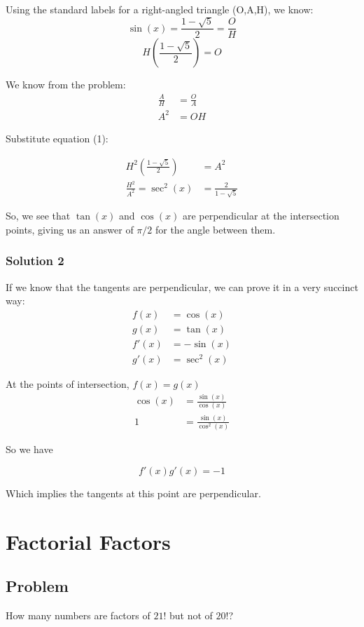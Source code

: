 \documentclass{article}
\begin{document}
Using the standard labels for a right-angled triangle (O,A,H), we know:
\begin{equation*}
\sin(x)=\frac{1-\sqrt{5}}{2}=\frac{O}{H}
\end{equation*}
\begin{equation}
H(\frac{1-\sqrt{5}}{2})=O
\end{equation}

We know from the problem:
\begin{align*}
  \frac{A}{H}&=\frac{O}{A}\\
  A^2&=OH
\end{align*}

Substitute equation (1):

\begin{align*}
  H^2(\frac{1-\sqrt{5}}{2})&=A^2\\
  \frac{H^2}{A^2}=\sec^2(x)&=\frac{2}{1-\sqrt{5}}
\end{align*}

So, we see that \(\tan(x)\) and \(\cos(x)\) are perpendicular at the intersection points, giving us an answer of \(\pi/2\) for the angle between them.
\subsubsection{Solution 2}
If we know that the tangents are perpendicular, we can prove it in a very succinct way:
\begin{align*}
  f(x)&=\cos(x)\\
  g(x)&=\tan(x)\\
  f'(x)&=-\sin(x)\\
  g'(x)&=\sec^2(x)
\end{align*}

At the points of intersection, \(f(x)=g(x)\)
\begin{align*}
  \cos(x)&=\frac{\sin(x)}{\cos(x)}\\
  1&=\frac{\sin(x)}{\cos^2(x)}
\end{align*}

So we have

\begin{equation*}
  f'(x)g'(x)=-1
\end{equation*}

Which implies the tangents at this point are perpendicular.

\section{Factorial Factors}
\subsection{Problem}
How many numbers are factors of \(21!\) but not of \(20!\)?
\end{document}
